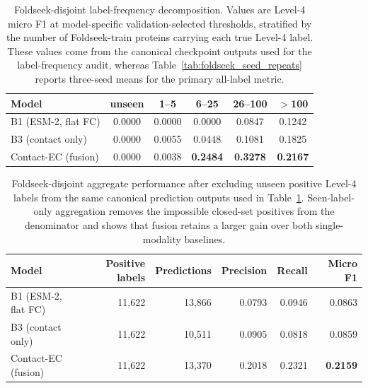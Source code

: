 \documentclass[11pt,a4paper]{article}
\begin{document}
\begin{table}[htbp]
\centering
\caption{Foldseek-disjoint label-frequency decomposition. Values are Level-4
micro F1 at model-specific validation-selected thresholds, stratified by the
number of Foldseek-train proteins carrying each true Level-4 label. These values
come from the canonical checkpoint outputs used for the label-frequency audit,
whereas Table~\ref{tab:foldseek_seed_repeats} reports three-seed means for the
primary all-label metric.}
\label{tab:foldseek_label_frequency}
\small
\setlength{\tabcolsep}{4pt}
\begin{tabular}{lccccc}
\toprule
Model & unseen & 1--5 & 6--25 & 26--100 & $>$100 \\
\midrule
B1 (ESM-2, flat FC) & 0.0000 & 0.0000 & 0.0000 & 0.0847 & 0.1242 \\
B3 (contact only) & 0.0000 & 0.0055 & 0.0448 & 0.1081 & 0.1825 \\
Contact-EC (fusion) & 0.0000 & 0.0038 & \textbf{0.2484} & \textbf{0.3278} & \textbf{0.2167} \\
\bottomrule
\end{tabular}
\end{table}

\begin{table}[htbp]
\centering
\caption{Foldseek-disjoint aggregate performance after excluding unseen positive
Level-4 labels from the same canonical prediction outputs used in
Table~\ref{tab:foldseek_label_frequency}. Seen-label-only aggregation removes
the impossible closed-set positives from the denominator and shows that fusion
retains a larger gain over both single-modality baselines.}
\label{tab:foldseek_seen_label_aggregate}
\small
\setlength{\tabcolsep}{4pt}
\begin{tabular}{lrrrrr}
\toprule
Model & Positive labels & Predictions & Precision & Recall & Micro F1 \\
\midrule
B1 (ESM-2, flat FC) & 11{,}622 & 13{,}866 & 0.0793 & 0.0946 & 0.0863 \\
B3 (contact only) & 11{,}622 & 10{,}511 & 0.0905 & 0.0818 & 0.0859 \\
Contact-EC (fusion) & 11{,}622 & 13{,}370 & 0.2018 & 0.2321 & \textbf{0.2159} \\
\bottomrule
\end{tabular}
\end{table}
\end{document}
